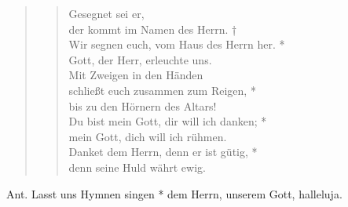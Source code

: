 \begin{quote}
\begin{verse}
\vin Gesegnet sei er,\\
\vin der kommt im Namen des Herrn. †\\ 
\vin Wir segnen euch, vom Haus des Herrn her. *\\
\vin Gott, der Herr, erleuchte uns.\\
Mit Zweigen in den Händen\\
schließt euch zusammen zum Reigen, *\\
bis zu den Hörnern des Altars!\\
\vin Du bist mein Gott, dir will ich danken; *\\
\vin mein Gott, dich will ich rühmen.\\
Danket dem Herrn, denn er ist gütig, *\\
denn seine Huld währt ewig.\\

\end{verse}
\end{quote}

\medskip

\def\greinitialformat#1{{\fontsize{40}{40}\selectfont #1}}
\gresetfirstlineaboveinitial{\textcolor{red}{Dan 3}}{}
\setaboveinitialseparation{0.72mm}
\smallskip

\begin{sloppypar}
{\noindent\rm{Ant. Lasst uns Hymnen singen * dem Herrn, unserem Gott, halleluja.}}
\end{sloppypar}

\medskip




